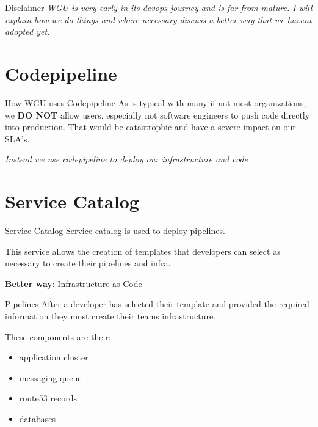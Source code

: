 \documentclass{beamer}
\begin{document}
    \begin{frame}{Disclaimer}
      \textit{WGU is very early in its devops journey and is far from mature.
      I will explain how we do things and where necessary discuss a better way
      that we havent adopted yet.}
    \end{frame}


  \section{Codepipeline}

    \begin{frame}{How WGU uses Codepipeline}
      As is typical with many if not most organizations, we \textbf{DO NOT} 
      allow users, especially not software engineers to push code directly 
      into production. That would be catastrophic and have a severe impact
      on our SLA's.

      \vfill
      \textit{Instead we use codepipeline to deploy our infrastructure and code}
    \end{frame}

  \section{Service Catalog}
    \begin{frame}{Service Catalog}
      Service catalog is used to deploy pipelines.

      This service allows the creation of templates that developers can
      select as necessary to create their pipelines and infra.

      \vfill
      \textbf{Better way}: Infrastructure as Code
    \end{frame}

    \begin{frame}{Pipelines}
      After a developer has selected their template and provided the
      required information they must create their teams infrastructure.

      These components are their:
      \begin{itemize}
        \item application cluster
        \item messaging queue
        \item route53 records
        \item databases
      \end{itemize}
    \end{frame}
\end{document}
